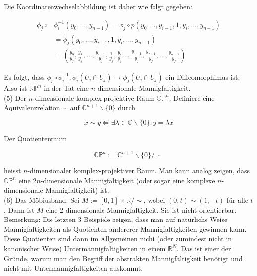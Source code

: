 \documentclass[10pt]{article}
\begin{document}
Die Koordinatenwechselabbildung ist daher wie folgt gegeben:

$$
\begin{aligned}
\phi_{j} \circ & \phi_{i}^{-1}\left(y_{0}, \ldots, y_{n-1}\right)=\phi_{j} \circ p\left(y_{0}, \ldots, y_{i-1}, 1, y_{i}, \ldots, y_{n-1}\right) \\
& =\tilde{\phi}_{j}\left(y_{0}, \ldots, y_{i-1}, 1, y_{i}, \ldots, y_{n-1}\right) \\
& =\left(\frac{y_{0}}{y_{j}}, \frac{y_{1}}{y_{j}}, \ldots, \frac{y_{i-1}}{y_{j}}, \frac{1}{y_{j}}, \frac{y_{i}}{y_{j}} \ldots, \frac{y_{j-1}}{y_{j}}, \frac{y_{j+1}}{y_{j}}, \ldots, \frac{y_{n-1}}{y_{j}}\right)
\end{aligned}
$$

Es folgt, dass $\phi_{j} \circ \phi_{i}^{-1}: \phi_{i}\left(U_{i} \cap U_{j}\right) \rightarrow \phi_{j}\left(U_{i} \cap U_{j}\right)$ ein Diffeomorphimus ist. Also ist $\mathbb{R P}^{n}$ in der Tat eine $n$-dimensionale Mannigfaltigkeit.\\
(5) Der $n$-dimensionale komplex-projektive Raum $\mathbb{C P}^{n}$. Definiere eine Äquivalenzrelation $\sim$ auf $\mathbb{C}^{n+1} \backslash\{0\}$ durch

$$
x \sim y \Longleftrightarrow \exists \lambda \in \mathbb{C} \backslash\{0\}: y=\lambda x
$$

Der Quotientenraum

$$
\mathbb{C P}^{n}:=\mathbb{C}^{n+1} \backslash\{0\} / \sim
$$

heisst $n$-dimensionaler komplex-projektiver Raum. Man kann analog zeigen, dass $\mathbb{C P}^{n}$ eine $2 n$-dimensionale Mannigfaltigkeit (oder sogar eine komplexe $n$-dimensionale Mannigfaltigkeit) ist.\\
(6) Das Möbiusband. Sei $M:=[0,1] \times \mathbb{R} / \sim$, wobei $(0, t) \sim(1,-t)$ für alle $t$. Dann ist $M$ eine 2-dimensionale Mannigfaltigkeit. Sie ist nicht orientierbar.\\
Bemerkung: Die letzten 3 Beispiele zeigen, dass man auf natürliche Weise Mannigfaltigkeiten als Quotienten andererer Mannigfaltigkeiten gewinnen kann. Diese Quotienten sind dann im Allgemeinen nicht (oder zumindest nicht in kanonischer Weise) Untermannigfaltigkeiten in einem $\mathbb{R}^{N}$. Das ist einer der Gründe, warum man den Begriff der abstrakten Mannigfaltigkeit benötigt und nicht mit Untermannigfaltigkeiten auskommt.
\end{document}
